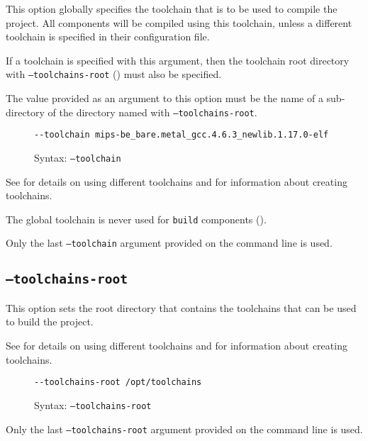 This option globally specifies the toolchain that is to be used to
compile the project.  All components will be compiled using this
toolchain, unless a different toolchain is specified in their
configuration file.

If a toolchain is specified with this argument, then the toolchain
root directory with \texttt{--toolchains-root}
() must also be specified.

The value provided as an argument to this option must be the name of a
sub-directory of the directory named with \texttt{--toolchains-root}.

\begin{figure}[h]
  \hrulefill
\begin{verbatim}
--toolchain mips-be_bare.metal_gcc.4.6.3_newlib.1.17.0-elf
\end{verbatim}
  \caption{Syntax: \texttt{--toolchain}}
  \hrulefill
\end{figure}

See  for details on using different
toolchains and  for information
about creating toolchains.

The global toolchain is never used for \texttt{build} components
().

Only the last \texttt{--toolchain} argument provided on the command
line is used.

\subsection{\texttt{--toolchains-root}}\label{usinglmsbw:toolchains-root}

This option sets the root directory that contains the toolchains that
can be used to build the project.

See  for details on using different
toolchains and  for information
about creating toolchains.

\begin{figure}[h]
  \hrulefill
\begin{verbatim}
--toolchains-root /opt/toolchains
\end{verbatim}
  \caption{Syntax: \texttt{--toolchains-root}}
  \hrulefill
\end{figure}

Only the last \texttt{--toolchains-root} argument provided on the command
line is used.

